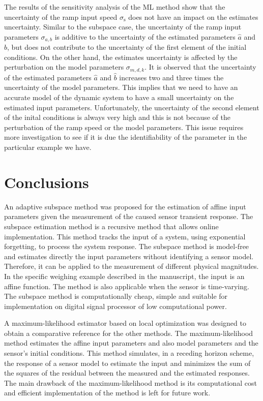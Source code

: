 The results of the sensitivity analysis of the ML method show that the uncertainty of the ramp input speed $\sigma_{\mathrm{s}}$ does not have an impact on the estimates uncertainty.
Similar to the subspace case, the uncertainty of the ramp input parameters $\sigma_{a,b}$ is additive to the uncertainty of the estimated parameters $\widehat{a}$ and $\widehat{b}$, but does not contribute to the uncertainty of the first element of the initial conditions.
On the other hand, the estimates uncertainty is affected by the perturbation on the model parameters $\sigma_{m,d,k}$.
It is observed that the uncertainty of the estimated parameters $\widehat{a}$ and $\widehat{b}$ increases two and three times the uncertainty of the model parameters.
This implies that we need to have an accurate model of the dynamic system to have a small uncertainty on the estimated input parameters.
Unfortunately, the uncertainty of the second element of the inital conditions is always very high and this is not because of the perturbation of the ramp speed or the model parameters. 
This issue requires more investigation to see if it is due the identifiability of the parameter in the particular example we have.


\section{Conclusions}

An adaptive subspace method was proposed for the estimation of affine input parameters given the measurement of the caused sensor transient response. 
The subspace estimation method is a recursive method that allows online implementation.
This method tracks the input of a system, using exponential forgetting, to process the system response.
The subspace method is model-free and estimates directly the input parameters without identifying a sensor model.
Therefore, it can be applied to the measurement of different physical magnitudes.
In the specific weighing example described in the manuscript, the input is an affine function.
The method is also applicable when the sensor is time-varying.
The subspace method is computationally cheap, simple and suitable for implementation on digital signal processor of low computational power. 

A maximum-likelihood estimator based on local optimization was designed to obtain a comparative reference for the other methods.
The maximum-likelihood method estimates the affine input parameters and also model parameters and the sensor's initial conditions.
This method simulates, in a receding horizon scheme, the response of a sensor model to estimate the input and minimizes the sum of the squares of the residual between the measured and the estimated responses.
The main drawback of the maximum-likelihood method is its computational cost and efficient implementation of the method is left for future work.

